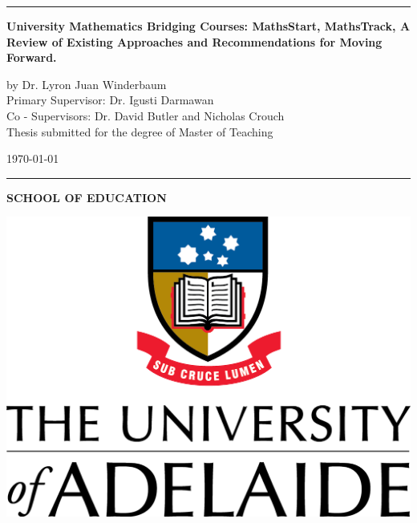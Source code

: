 \documentclass[twoside,12pt,a4paper]{report}
\begin{document}
\begin{titlepage}

\begin{flushleft}
\null
\vspace{2 cm}
\hrule
\vspace{1 cm}
{\huge{\bf University Mathematics Bridging Courses: MathsStart, MathsTrack, A Review of Existing Approaches and Recommendations for Moving Forward.}}
\vspace*{2cm}

\vspace{5.5 cm}
{\large by Dr. Lyron Juan Winderbaum}\\
\vspace{1 cm}
{\large Primary Supervisor: Dr. Igusti Darmawan}\\
\vspace{0.5 cm}
{\large Co - Supervisors: Dr. David Butler and Nicholas Crouch}\\
\vspace{2 cm}
{ Thesis submitted for the degree of Master of Teaching }\\
\vspace{0.5 cm}
\end{flushleft}

\begin{flushright}
{\monthyeardate\today }
\end{flushright}

\vspace{0.5 cm}
\hrule
\vspace{0.65cm}

\begin{flushleft}
\textbf{SCHOOL OF EDUCATION}
\end{flushleft}
\vspace{-1.5cm}
\begin{flushright}
\includegraphics[scale=0.75]{./files/UoA_logo_col_vert.png}
\end{flushright}
\vspace{-2 cm}

\end{titlepage}
\end{document}
